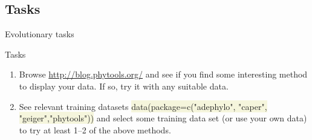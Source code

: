 \documentclass[compress, ucs, xelatex, 11pt, xcolor=svgnames, aspectratio=169,
	hyperref={
		bookmarks=true,
		unicode=true,
		colorlinks=true,
		pdftitle={Molecular data in R},
		plainpages=false,
		pdfauthor={Vojtech Zeisek},
		pdfsubject={Course about phylogeny and evolution in R},
		pdfcreator={XeLaTeX},
		pdfkeywords={R, evolution, phylogeny, molecular data},
		linkcolor=Crimson, %
		anchorcolor=Magenta, %
		citecolor=Magenta, %
		filecolor=Magenta, %
		menucolor=Magenta, %
		urlcolor=DodgerBlue, %
		pdftex},
	url={hyphens, lowtilde} %
	]{beamer}
\renewcommand{\texttt}[1]{\colorbox{Beige}{{\ttfamily #1}}}
\begin{document}
%
%

\subsection{Tasks}

\begin{frame}{Evolutionary tasks}
	\begin{exampleblock}{Tasks}
		\begin{enumerate}
			\item Browse \url{http://blog.phytools.org/} and see if you find some interesting method to display your data. If so, try it with any suitable data.
			\item See relevant training datasets \texttt{data(package=c("adephylo", "caper", "geiger","phytools"))} and select some training data set (or use your own data) to try at least 1--2 of the above methods.
		\end{enumerate}
	\end{exampleblock}
\end{frame}

\section{}
\end{document}
